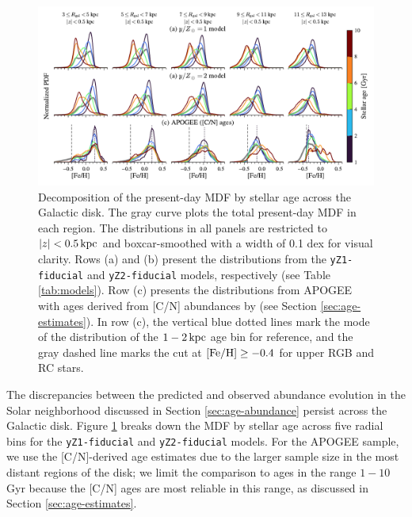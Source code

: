 \documentclass[twocolumn,twocolappendix,linenumbers]{aastex631}
\newcommand{\mathFeH}{{\rm [Fe/H]}}
\newcommand{\kpc}{\,{\rm kpc}}
\begin{document}
\begin{figure}
    \centering
    \includegraphics[width=\textwidth]{figures/mdf_evolution.pdf}
    \caption{Decomposition of the present-day MDF by stellar age across the Galactic disk. 
    The gray curve plots the total present-day MDF in each region. The distributions in all panels are restricted to $|z|<0.5\kpc$ and boxcar-smoothed with a width of {0.1 dex} for visual clarity. Rows (a) and (b) present the distributions from the {\tt yZ1-fiducial} and {\tt yZ2-fiducial} models, respectively (see Table \ref{tab:models}). 
    Row (c) presents the distributions from APOGEE with ages derived from [C/N] abundances by \citet{roberts_cn_2025} (see Section \ref{sec:age-estimates}). In row (c), the vertical blue dotted lines mark the mode of the distribution of the $1-2\kpc$ age bin for reference, and the gray dashed line marks the cut at $\mathFeH\ge-0.4$ for upper RGB and RC stars.%
    }
    \label{fig:mdf-evolution}
\end{figure}

The discrepancies between the predicted and observed abundance evolution in the Solar neighborhood discussed in Section \ref{sec:age-abundance} persist across the Galactic disk. Figure \ref{fig:mdf-evolution} breaks down the MDF by stellar age across five radial bins for the {\tt yZ1-fiducial} and {\tt yZ2-fiducial} models. For the APOGEE sample, we use the [C/N]-derived age estimates due to the larger sample size in the most distant regions of the disk; we limit the comparison to ages in the range $1-10$ Gyr because the [C/N] ages are most reliable in this range, as discussed in Section \ref{sec:age-estimates}. 
\end{document}
